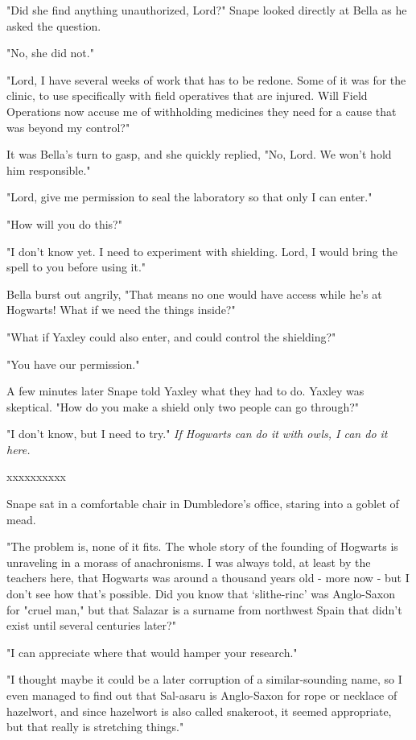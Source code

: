 \documentclass[a4paper,11pt]{article}
\begin{document}
"Did she find anything unauthorized, Lord?" Snape looked directly at Bella as he asked the question.

"No, she did not."

"Lord, I have several weeks of work that has to be redone. Some of it was for the clinic, to use specifically with field operatives that are injured. Will Field Operations now accuse me of withholding medicines they need for a cause that was beyond my control?"

It was Bella's turn to gasp, and she quickly replied, "No, Lord. We won't hold him responsible."

"Lord, give me permission to seal the laboratory so that only I can enter."

"How will you do this?"

"I don't know yet. I need to experiment with shielding. Lord, I would bring the spell to you before using it."

Bella burst out angrily, "That means no one would have access while he's at Hogwarts! What if we need the things inside?"

"What if Yaxley could also enter, and could control the shielding?"

"You have our permission."

A few minutes later Snape told Yaxley what they had to do. Yaxley was skeptical. "How do you make a shield only two people can go through?"

"I don't know, but I need to try." \emph{If Hogwarts can do it with owls, I can do it here.}

xxxxxxxxxx

Snape sat in a comfortable chair in Dumbledore's office, staring into a goblet of mead.

"The problem is, none of it fits. The whole story of the founding of Hogwarts is unraveling in a morass of anachronisms. I was always told, at least by the teachers here, that Hogwarts was around a thousand years old - more now - but I don't see how that's possible. Did you know that `slithe-rinc' was Anglo-Saxon for "cruel man," but that Salazar is a surname from northwest Spain that didn't exist until several centuries later?"

"I can appreciate where that would hamper your research."

"I thought maybe it could be a later corruption of a similar-sounding name, so I even managed to find out that Sal-asaru is Anglo-Saxon for rope or necklace of hazelwort, and since hazelwort is also called snakeroot, it seemed appropriate, but that really is stretching things."
\end{document}
